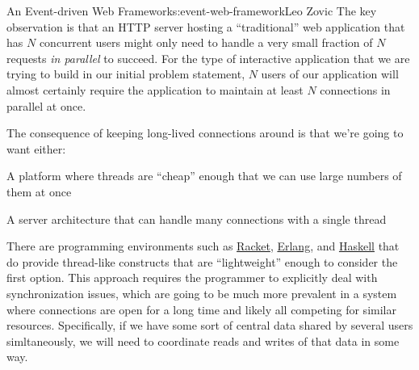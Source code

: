 \begin{aosachapter}{An Event-driven Web Framework}{s:event-web-framework}{Leo Zovic}
The key observation is that an HTTP server hosting a ``traditional'' web
application that has $N$ concurrent users might only need to handle a
very small fraction of $N$ requests \emph{in parallel} to succeed. For
the type of interactive application that we are trying to build in our
initial problem statement, $N$ users of our application will almost
certainly require the application to maintain at least $N$ connections
in parallel at once.

The consequence of keeping long-lived connections around is that we're
going to want either:

\begin{aosaitemize}

\item
  A platform where threads are ``cheap'' enough that we can use large
  numbers of them at once
\item
  A server architecture that can handle many connections with a single
  thread
\end{aosaitemize}

There are programming environments such as
\href{http://racket-lang.org/}{Racket},
\href{http://www.erlang.org/}{Erlang}, and
\href{http://hackage.haskell.org/package/base-4.7.0.1/docs/Control-Concurrent.html}{Haskell}
that do provide thread-like constructs that are ``lightweight'' enough
to consider the first option. This approach requires the programmer to
explicitly deal with synchronization issues, which are going to be much
more prevalent in a system where connections are open for a long time
and likely all competing for similar resources. Specifically, if we have
some sort of central data shared by several users simltaneously, we will
need to coordinate reads and writes of that data in some way.


\end{aosachapter}
